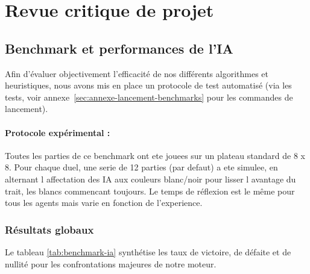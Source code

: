 \documentclass[a4paper]{article}
\begin{document}
\section{Revue critique de projet}

\subsection{Benchmark et performances de l'IA}

Afin d'évaluer objectivement l'efficacité de nos différents algorithmes et heuristiques, nous avons mis en place un protocole de test automatisé 
(via les tests, voir annexe~\ref{sec:annexe-lancement-benchmarks} pour les commandes de lancement). 

\paragraph{Protocole expérimental :}
Toutes les parties de ce benchmark ont ete jouees sur un plateau standard de 8 x 8. Pour chaque duel, une serie de 12 parties (par defaut) a 
ete simulee, en alternant l affectation des IA aux couleurs blanc/noir pour lisser l avantage du trait, les blancs commencant toujours. Le temps de réflexion est
le même pour tous les agents mais varie en fonction de l'experience.

\subsubsection{Résultats globaux}

Le tableau \ref{tab:benchmark-ia} synthétise les taux de victoire, de défaite et de nullité pour les confrontations majeures de notre moteur.
\end{document}
